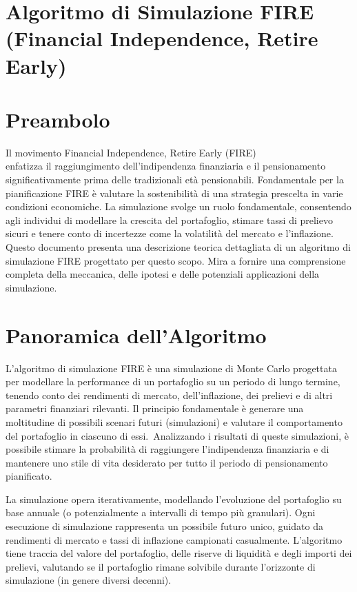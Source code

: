 \documentclass{article}
\begin{document}
\section*{Algoritmo di Simulazione FIRE (Financial Independence, Retire Early)}
   
    \section{Preambolo}\label{sec:preambolo2}

Il movimento Financial Independence, Retire Early (FIRE) \\ enfatizza il
    raggiungimento dell'indipendenza finanziaria e il pensionamento
    significativamente prima delle tradizionali età pensionabili.
    Fondamentale
    per la pianificazione FIRE è valutare la sostenibilità di una strategia
    prescelta in varie condizioni economiche.
    La simulazione svolge un ruolo
    fondamentale, consentendo agli individui di modellare la crescita del
    portafoglio, stimare tassi di prelievo sicuri e tenere conto di incertezze
    come la volatilità del mercato e l'inflazione.
    Questo documento presenta una
    descrizione teorica dettagliata di un algoritmo di simulazione FIRE
    progettato per questo scopo.
    Mira a fornire una comprensione completa della
    meccanica, delle ipotesi e delle potenziali applicazioni della simulazione.

    \section{Panoramica dell'Algoritmo}\label{sec:panoramica-dell'algoritmo}

L'algoritmo di simulazione FIRE è una simulazione di Monte Carlo progettata per
modellare la performance di un portafoglio su un periodo di lungo termine,
tenendo conto dei rendimenti di mercato, dell'inflazione, dei prelievi e di
altri parametri finanziari rilevanti.
Il principio fondamentale è generare una
moltitudine di possibili scenari futuri (simulazioni) e valutare il
comportamento del portafoglio in ciascuno di essi.\ Analizzando i risultati di
queste simulazioni, è possibile stimare la probabilità di raggiungere
l'indipendenza finanziaria e di mantenere uno stile di vita desiderato per tutto
il periodo di pensionamento pianificato.

    La simulazione opera iterativamente, modellando l'evoluzione del portafoglio
    su base annuale (o potenzialmente a intervalli di tempo più granulari).
    Ogni
    esecuzione di simulazione rappresenta un possibile futuro unico, guidato da
    rendimenti di mercato e tassi di inflazione campionati casualmente.
    L'algoritmo tiene traccia del valore del portafoglio, delle riserve di
    liquidità e degli importi dei prelievi, valutando se il portafoglio rimane
    solvibile durante l'orizzonte di simulazione (in genere diversi decenni).
\end{document}
